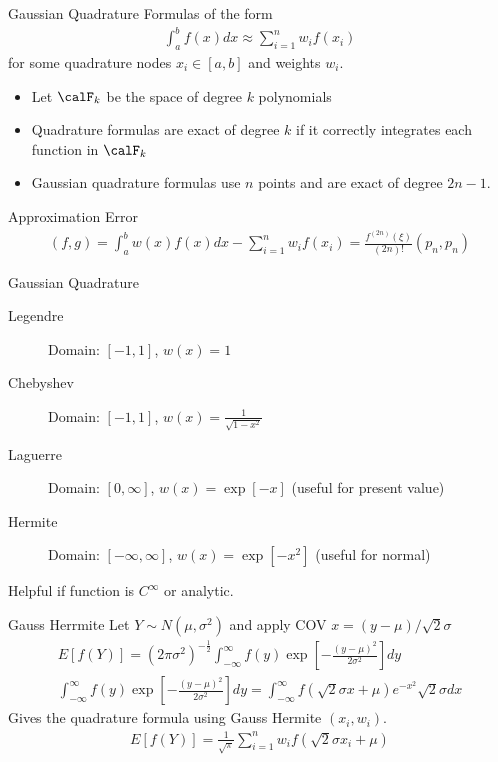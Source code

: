 \begin{frame}{Gaussian Quadrature}
Formulas of the form
\begin{eqnarray*}
\int_{a}^b f(x) d x \approx \sum_{i=1}^n  w_i f(x_i)
\end{eqnarray*}
for some quadrature nodes $x_i \in [a,b]$ and weights $w_i$.
\begin{itemize}
\item Let $\calF_k$ be the space of degree $k$ polynomials
\item Quadrature formulas are exact of degree $k$ if it correctly integrates each function in $\calF_k$
\item Gaussian quadrature formulas use $n$ points and are exact of degree $2n-1$.
\end{itemize}
Approximation Error
\begin{eqnarray*}
(f,g) = \int_a^b w(x) f(x)  dx - \sum_{i=1}^n w_i f(x_i) = \frac{f^{(2n)}(\xi)}{(2n)!} (p_n,p_n) 
\end{eqnarray*}
\end{frame}

\begin{frame}{Gaussian Quadrature}
\begin{description}
\item[Legendre] Domain: $[-1,1]$, $w(x) = 1$
\item[Chebyshev] Domain: $[-1,1]$, $w(x) = \frac{1}{\sqrt{1-x^2}}$
\item[Laguerre] Domain: $[0,\infty]$, $w(x) = \exp[-x]$ (useful for present value)
\item[Hermite] Domain: $[-\infty,\infty]$, $w(x) = \exp[-x^2]$ (useful for normal)
\end{description}
Helpful if function is $C^{\infty}$ or analytic.
\end{frame}

\begin{frame}{Gauss Herrmite}
Let $Y\sim N(\mu,\sigma^2)$ and apply COV $x = (y-\mu)/\sqrt{2} \sigma$
\begin{eqnarray*}
E[f(Y)] = (2 \pi \sigma^2)^{-\frac{1}{2}} \int_{-\infty}^{\infty} f(y) \exp\left[-\frac{(y-\mu)^2}{2\sigma^2} \right] dy \\
\int_{-\infty}^{\infty} f(y) \exp\left[-\frac{(y-\mu)^2}{2\sigma^2} \right] dy = \int_{-\infty}^{\infty} f(\sqrt{2} \sigma x + \mu) e^{-x^2} \sqrt{2} \sigma dx
\end{eqnarray*}
Gives the quadrature formula using Gauss Hermite $(x_i,w_i)$.
\begin{eqnarray*}
E[f(Y)] = \frac{1}{\sqrt{\pi}} \sum_{i=1}^n w_i f(\sqrt{2}\sigma x_i + \mu)
\end{eqnarray*}
\end{frame}

